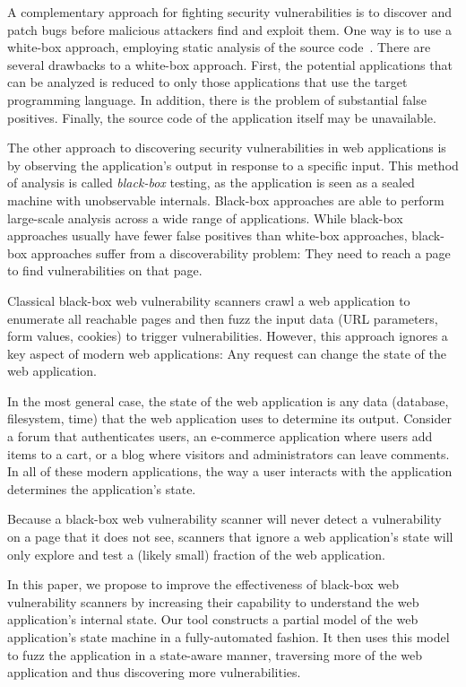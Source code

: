 A complementary approach for fighting security vulnerabilities is to discover and
patch bugs before malicious attackers find and exploit them. One way is to use
a white-box approach, employing static analysis of the source
code~\cite{felmetsger10:logic,huang03:web,jovanovic10:static,balzarotti08:saner}.
There are several drawbacks to a white-box approach. First, the potential
applications that can be analyzed is reduced to only those applications that
use the target programming language. In addition, there is the problem of
substantial false positives. Finally, the source code of the
application itself may be unavailable.

The other approach to discovering security vulnerabilities in web applications
is by observing the application's output in response to a specific input. This
method of analysis is called \emph{black-box} testing, as the application is
seen as a sealed machine with unobservable internals. Black-box approaches are
able to perform large-scale analysis across a wide range of applications. While
black-box approaches usually have fewer false positives than white-box
approaches, black-box approaches suffer from a discoverability problem: They
need to reach a page to find vulnerabilities on that page.

Classical black-box web vulnerability scanners crawl a web application to
enumerate all reachable pages and then fuzz the input data (URL parameters,
form values, cookies) to trigger vulnerabilities. However, this approach
ignores a key aspect of modern web applications: Any request can change the state of the web application.

In the most general case, the state of the web application is any data
(database, filesystem, time) that the web application uses to determine
its output. Consider a forum that authenticates users, an e-commerce
application where users add items to a cart, or a blog where visitors and
administrators can leave comments. In all of these modern applications, the way
a user interacts with the application determines the application's state.

Because a black-box web vulnerability scanner will never detect a vulnerability
on a page that it does not see, scanners that ignore a web application's state
will only explore and test a (likely small) fraction of the web application.

In this paper, we propose to improve the effectiveness of black-box web vulnerability scanners by
increasing their capability to understand the web application's internal state.
Our tool constructs a partial model of the web application's state machine in a
fully-automated fashion. It then uses this model to fuzz the application in a
state-aware manner, traversing more of the web application and thus discovering
more vulnerabilities.

